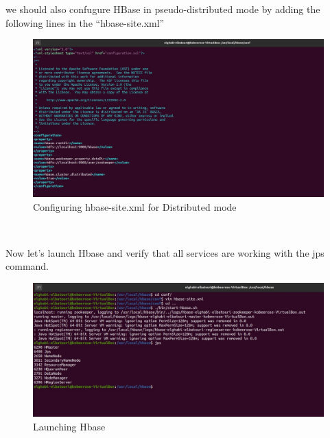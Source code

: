 \begin{spacing}{1.2}
\par we should also confugure HBase in pseudo-distributed mode by adding the following lines in the “hbase-site.xml”
\\
\begin{figure}[!htb] 
\begin{center} 
\includegraphics[width=1\linewidth]{Pictures/HBase/Configuring Hbase in Standalone & Pseudo-distributed mode/Configuring Hbase in Pseudo-distributed mode/Configuring hbase-site.xml for Distributed mode} 
\end{center} 
\caption{Configuring hbase-site.xml for Distributed mode} 
\end{figure}  \FloatBarrier
\\

\par Now let's launch Hbase and verify that all services are working with the jps command.
\\
\begin{figure}[!htb] 
\begin{center} 
\includegraphics[width=1\linewidth]{Pictures/HBase/Configuring Hbase in Standalone & Pseudo-distributed mode/Configuring Hbase in Pseudo-distributed mode/Launching Hbase} 
\end{center} 
\caption{Launching Hbase} 
\end{figure}  \FloatBarrier
\\


\end{spacing}
